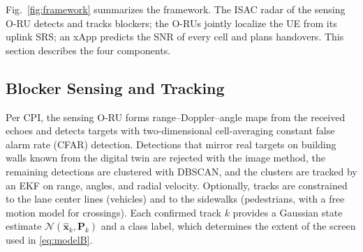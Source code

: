 \documentclass[journal]{IEEEtran}
\begin{document}
Fig.~\ref{fig:framework} summarizes the framework. The ISAC radar of the
sensing O-RU detects and tracks blockers; the O-RUs jointly localize the
UE from its uplink SRS; an xApp predicts the SNR of every cell and plans
handovers. This section describes the four components.

\subsection{Blocker Sensing and Tracking}
Per CPI, the sensing O-RU forms range--Doppler--angle maps from the
received echoes and detects targets with two-dimensional cell-averaging
constant false alarm rate (CFAR) detection. Detections that mirror real
targets on building walls known from the digital twin are rejected with
the image method, the remaining detections are clustered with DBSCAN,
and the clusters are tracked by an EKF on range, angles, and radial
velocity. Optionally, tracks are constrained to the lane center lines
(vehicles) and to the sidewalks (pedestrians, with a free motion model
for crossings). Each confirmed track $k$ provides a Gaussian state
estimate $\mathcal N(\hat{\mathbf x}_k,\mathbf P_k)$ and a class label,
which determines the extent of the screen used in \eqref{eq:modelB}.
\end{document}
